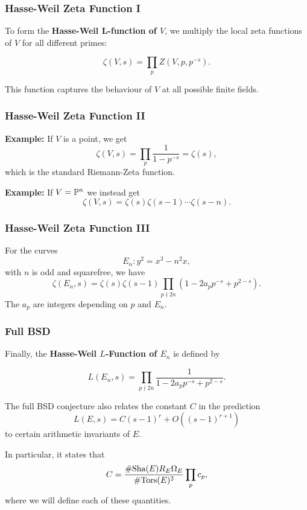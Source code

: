\documentclass{beamer}
\begin{document}
\begin{frame}
  \frametitle{Hasse-Weil Zeta Function I}
  To form the \textbf{Hasse-Weil L-function of $V$},
  we multiply the local zeta functions
  of $V$ for all different primes:

  \[\zeta(V,s) = \prod\limits_p Z(V,p,p^{-s}).\] 

  This function captures the behaviour of $V$ at all possible finite fields.

\end{frame}

\begin{frame}
  \frametitle{Hasse-Weil Zeta Function II}
  \textbf{Example:} If $V$ is a point, we get
  \[\zeta(V,s) = \prod \limits_p \frac{1}{1-p^{-s}} = \zeta(s),\]
  which is the standard Riemann-Zeta function. \pause
  \bigskip

  \textbf{Example:} If $V = {\mathbb P}^n$ we instead get
  \[\zeta(V,s) = \zeta(s) \zeta(s-1) \cdots \zeta (s-n).\]
\end{frame}

\begin{frame}
  \frametitle{Hasse-Weil Zeta Function III}

  \begin{theorem}
    For the curves
    \[E_n : y^2 = x^3 - n^2 x,\]
    with $n$ is odd and squarefree, we have
    \[\zeta(E_n, s) = \zeta(s)\zeta(s-1) \prod\limits_{p \nmid 2n} (1 -
      2a_pp^{-s} + p^{2-s}).\]
    The $a_p$ are integers depending on $p$ and $E_n$.
  \end{theorem}
  
\end{frame}

\begin{frame}
  \frametitle{Full BSD}
 
  Finally, the \textbf{Hasse-Weil $L$-Function of $E_n$} is defined by

  \[L(E_n, s) = \prod\limits_{p \nmid 2n} \frac{1}{1 - 2a_p p^{-s} + p^{2-s}}.\] \pause
  \bigskip

  The full BSD conjecture also relates the constant $C$ in the prediction
  \[L(E,s) = C(s-1)^r + O((s-1)^{r+1})\]
  to certain arithmetic invariants of $E$. \pause
  \bigskip

  In particular, it states that
  \[C = \frac{\# \text{\normalfont Sha}(E) R_E \Omega_E}{\# {\text{\normalfont Tors}}(E)^2} \prod\limits_p c_p,\]
  where we will define each of these quantities.
\end{frame}
\end{document}
